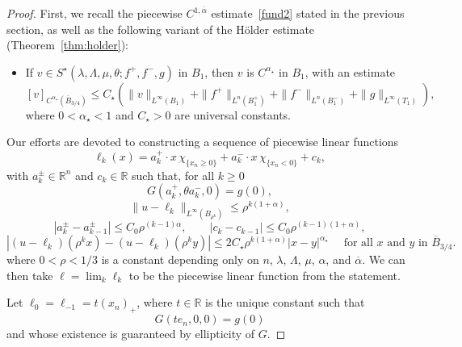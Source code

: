 \documentclass[letter,11pt]{amsart}
\newcommand{\R}{\mathbb{R}}
\newcommand{\chara}[1]{\chi_{#1}}
\newcommand{\mao}{\alpha_{\star}}
\theoremstyle{definition}
\numberwithin{equation}{section}
\begin{document}
\begin{proof}
First, we recall the piecewise $C^{1,\overline{\alpha}}$ estimate~\eqref{fund2} stated in the previous section, as well as the following variant of the H\"{o}lder estimate (Theorem~\ref{thm:holder}):
\begin{itemize}
\item 
If $v \in S^{\star}(\lambda, \Lambda, \mu, \theta; f^{+}, f^{-}, g)$ in $B_{1}$, then $v$ is $C^{\mao}$ in $B_1$, with an estimate
\begin{equation}
\label{fund1}
[v]_{C^{\mao}(\overline{B}_{3/4})} \leq C_{\star}\left( 
\|v\|_{L^{\infty}(B_{1})} + \|f^{+}\|_{L^{n}(B_{1}^{+})} + \|f^{-}\|_{L^{n}(B_{1}^{-})} + \|g\|_{L^{\infty}(T_{1})}
\right),
\end{equation}
where $0 < \mao < 1$ and $C_{\star} > 0$ are universal constants.
\end{itemize}

\medskip

Our efforts are devoted to constructing a sequence of piecewise linear functions
\begin{equation}
\label{g0}
\ell_k(x) = a_k^{+} \cdot x \, \chara{\{x_n \geq 0\}} + a_k^{-} \cdot x \, \chara{\{x_n < 0\}} + c_k,
\end{equation}
with $a_k^{\pm} \in \R^n$ and $c_k \in \R$ such that, for all $k \geq 0$
\begin{equation}
\label{g1}
G(a_k^{+}, \theta a_k^{-}, 0) = g(0),
\end{equation}
\begin{equation}
\label{g2}
\|u - \ell_k\|_{L^{\infty}(B_{\rho^{k}})} \leq \rho^{k(1+\alpha)},
\end{equation}
\begin{equation}
\label{g3}
|a_k^{\pm} - a_{k-1}^{\pm}| \leq C_0 \rho^{(k-1)\alpha}, \qquad |c_k - c_{k-1}| \leq C_0 \rho^{(k-1)(1+\alpha)},
\end{equation}
\begin{equation}
\label{g4}
|(u - \ell_k)(\rho^{k} x) - (u - \ell_k)(\rho^{k} y)| \leq 2 C_{\star} \rho^{k (1+ \alpha)} |x-y|^{\mao}
\quad \text{ for all } 
x \text{ and } y \text{ in } \overline{B}_{3/4}.
\end{equation}
where $0 < \rho < 1/3$ is a constant depending only on $n$, $\lambda$, $\Lambda$, $\mu$, $\alpha$, and $\overline{\alpha}$.
We can then take $\ell = \lim_{k} \ell_k$ to be the piecewise linear function from the statement.

\medskip

Let $\ell_0 = \ell_{-1} = t (x_n)_{+}$, where $t \in \R$ is the unique constant such that
\begin{equation}
\label{deo1}
G(t e_n, 0,0) = g(0)
\end{equation}
and whose existence is guaranteed by ellipticity of $G$.


\end{proof}
\end{document}
